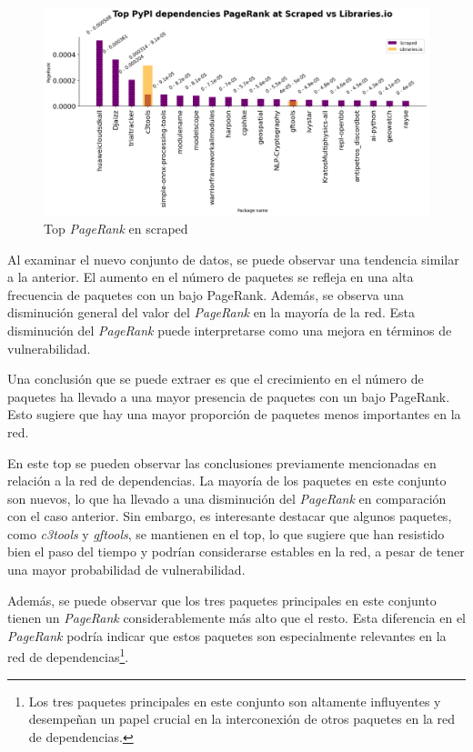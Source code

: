 \begin{figure}[h!]
    \begin{center}
        \includegraphics[width=1\textwidth]{img/pypi/t20_dep_pr_scraped.png}
        \caption{Top \textit{PageRank} en scraped}
        \label{fig:Top PageRank en scraped}
    \end{center}
\end{figure}

Al examinar el nuevo conjunto de datos, se puede observar una tendencia similar a la anterior.
El aumento en el número de paquetes se refleja en una alta frecuencia de paquetes con un bajo
PageRank. Además, se observa una disminución general del valor del \textit{PageRank} en la mayoría de
la red. Esta disminución del \textit{PageRank} puede interpretarse como una mejora en términos de
vulnerabilidad.

Una conclusión que se puede extraer es que el crecimiento en el número de paquetes ha llevado
a una mayor presencia de paquetes con un bajo PageRank. Esto sugiere que hay una mayor
proporción de paquetes menos importantes en la red.

En este top se pueden observar las conclusiones previamente mencionadas en relación a la red de
dependencias. La mayoría de los paquetes en este conjunto son nuevos, lo que ha llevado a una
disminución del \textit{PageRank} en comparación con el caso anterior. Sin embargo, es
interesante destacar que algunos paquetes, como \textit{c3tools} y
\textit{gftools},
se mantienen en el top, lo que sugiere que han resistido bien el paso del tiempo y podrían
considerarse estables en la red, a pesar de tener una mayor probabilidad de
vulnerabilidad.

Además, se puede observar que los tres paquetes principales en este conjunto tienen
un \textit{PageRank} considerablemente más alto que el resto. Esta diferencia en
el \textit{PageRank} podría indicar que estos paquetes son especialmente relevantes
en la red de dependencias\footnote{Los tres paquetes principales en este conjunto son
    altamente influyentes y desempeñan un papel crucial en la interconexión de otros paquetes
    en la red de dependencias.}.

